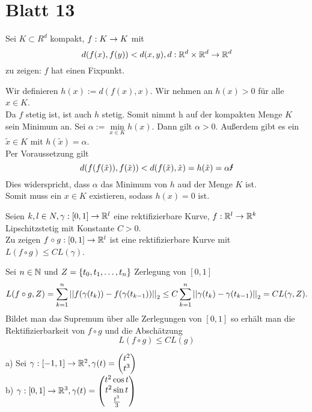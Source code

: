 \documentclass[../ana2u.tex]{subfiles}
\begin{document}
\setcounter{section}{13}
\section{Blatt 13}
\begin{bsp}[Aufgabe 62]
    Sei \(K \subset R^d\) kompakt, \(f:K\rightarrow K\) mit
    \[ d(f(x), f(y)) < d(x,y), d:\mathbb{R}^d \times \mathbb{R}^d\rightarrow \mathbb{R}^d \]
    zu zeigen: \(f\) hat einen Fixpunkt.
\end{bsp}
\begin{bew}
    Wir definieren \(h(x) := d(f(x), x)\). Wir nehmen an \(h(x) > 0\)
    für alle \(x \in K\).\\
    Da \(f\) stetig ist, ist auch \(h\) stetig. Somit nimmt h auf der kompakten
    Menge \(K\) sein Minimum an. Sei \(\alpha := \underset{x \in K}{\min} h(x)\).
    Dann gilt \(\alpha > 0\). Außerdem gibt es ein \(\tilde{x} \in K\) mit
    \(h(\tilde{x}) = \alpha\).\\
    Per Voraussetzung gilt
    \[ d(f(f(\tilde{x})), f(\tilde{x})) < d(f(\tilde{x}), \tilde{x}) = h(\tilde{x}) 
    = \alpha \text{\Lightning} \]
    Dies widerspricht, dass \( \alpha \) das Minimum von \(h\) aud der Menge \(K\) ist.\\
    Somit muss ein \( x \in K \) existieren, sodass \(h(x) = 0\) ist.
\end{bew}
\begin{bsp}[Aufgabe 63 (i)]
    Seien \( k, l \in N, \gamma:[0,1]\rightarrow \mathbb{R}^l \) eine rektifizierbare Kurve, 
    \( f:\mathbb{R}^l\rightarrow \mathbb{R}^k \) Lipschitzstetig mit Konstante \( C > 0 \).\\
    Zu zeigen \(  f \circ g :[0,1]\rightarrow \mathbb{R}^l \) ist eine rektifizierbare Kurve 
    mit \( L( f \circ g ) \leq C L(\gamma) \).
\end{bsp}
\begin{bew}
    Sei \(n \in \mathbb{N}\) und \( Z = \{t_0, t_1, \ldots, t_n\} \) Zerlegung von \( [0,1] \)
    \[ L(f \circ g, Z) = \sum_{k=1}^n \left|\left| f(\gamma(t_k)) - f(\gamma(t_{k-1})) \right|\right|_2 
    \leq C \sum_{k=1}^n \left|\left|\gamma(t_k) - \gamma(t_{k-1})\right|\right|_2 
    = C L(\gamma, Z). \]
    Bildet man das Supremum über alle Zerlegungen von \([0, 1]\) so erhält
    man die Rektifizierbarkeit von \(f \circ g\) und die Abschätzung
    \[L(f \circ g) \leq  CL(g)\]
\end{bew}
\begin{bsp}[Aufgabe 63 (ii)]
    a) Sei \(\gamma:[-1, 1]\rightarrow \mathbb{R}^2, \gamma(t) = \begin{pmatrix}
        t^2\\
        t^3
    \end{pmatrix}\) \\ 
    b) \( \gamma:[0,1]\rightarrow \mathbb{R}^3, \gamma(t) = \begin{pmatrix} 
        t^2 \cos t \\ 
        t^2 \sin t \\ 
        \frac{t^3}{3} 
    \end{pmatrix} \)
\end{bsp}
\end{document}
